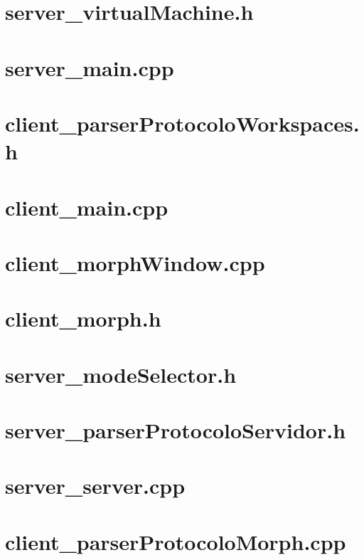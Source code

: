 \documentclass{article}
\begin{document}
\section{ server\_virtualMachine.h }

\newpage
\section{ server\_main.cpp }

\newpage
\section{ client\_parserProtocoloWorkspaces.h }

\newpage
\section{ client\_main.cpp }

\newpage
\section{ client\_morphWindow.cpp }

\newpage
\section{ client\_morph.h }

\newpage
\section{ server\_modeSelector.h }

\newpage
\section{ server\_parserProtocoloServidor.h }

\newpage
\section{ server\_server.cpp }

\newpage
\section{ client\_parserProtocoloMorph.cpp }

\newpage
\end{document}
